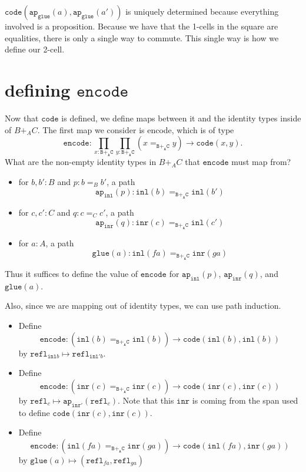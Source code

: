 \documentclass[12pt]{amsart}
\newcommand{\from}{\colon}
\newcommand{\type}[1]{\mathtt{#1}}
\newcommand{\A}{\type{A}}
\newcommand{\B}{\type{B}}
\newcommand{\C}{\type{C}}
\newcommand{\BAC}{\B +_{\A} \C}
\newcommand{\ap}{\type{ap}}
\newcommand{\inl}{\type{inl}}
\newcommand{\inr}{\type{inr}}
\newcommand{\glue}{\type{glue}}
\newcommand{\refl}{\type{refl}}
\newcommand{\code}{\type{code}}
\newcommand{\encode}{\type{encode}}
\theoremstyle{remark}
\theoremstyle{definition}
\begin{document}
	$\type{ code } ( \type{ ap }_\type{ glue } ( a ) , \type{ ap }_\type{ glue } ( a' )  )$ is uniquely determined because
	everything involved is a proposition. 
	Because we have that the 1-cells 
	in the square are equalities,
	there is only a single way to commute.
	This single way is how we define our 2-cell.

\pagebreak
\section{defining $\encode$}

Now that $ \code $ is defined, we define maps between it and the identity types inside of $ B+_A C $. The first map we consider is encode, which is of type
\[
	\encode : 
		\prod_{x : \BAC} \prod_{y : \BAC} 
		(x=_{\BAC} y) \to  \code (x,y).
\]
What are the non-empty identity types in $ B+_A C $ that $ \encode $ must map from?  
\begin{itemize}
	\item for $ b,b' : B $ and $ p : b =_B b'  $, a path 
	\[
		\ap_{\inl}(p) : \inl (b) =_{\BAC} \inl (b')
	\]
	\item for $ c,c' : C $ and $ q : c =_C c'  $, a path  
	\[
		\ap_{\inr}(q) : \inr (c) =_{\BAC} \inl (c') 
	\]
	\item for $ a : A $, a path  
	\[
		\glue (a) : \inl(fa) =_{\BAC} \inr(ga)
	\] 
\end{itemize}

Thus it suffices to define the value of $ \encode $ for $ \ap_{\inl}(p) $, $ \ap_{\inr}(q) $, and $ \glue (a) $.  

Also, since we are mapping out of identity types, we can use path induction.

\begin{itemize}
	\item Define 
	\[
		\encode \from (\inl (b) =_{\BAC} \inl (b)) \to \code (\inl(b),\inl(b))
	\] 
	by $ \refl_{\inl b} \mapsto \refl_{\inl' b}  $.
	\item Define 
	\[
		\encode \from (\inr (c) =_{\BAC} \inr (c)) \to \code (\inr(c),\inr(c))
	\] 
	by $ \refl_c \mapsto \ap_{\inr'} (\refl_c)  $. Note that this $ \inr $ is coming from the span used to define $ \code(\inr(c),\inr(c)) $.
	\item Define 
	\[
		\encode \from (\inl (fa) =_{\BAC} \inr (ga)) \to \code (\inl(fa),\inr(ga))
	\]
	by $ \glue (a) \mapsto ( \refl_{fa} , \refl_{ga}) $
\end{itemize}
\end{document}
